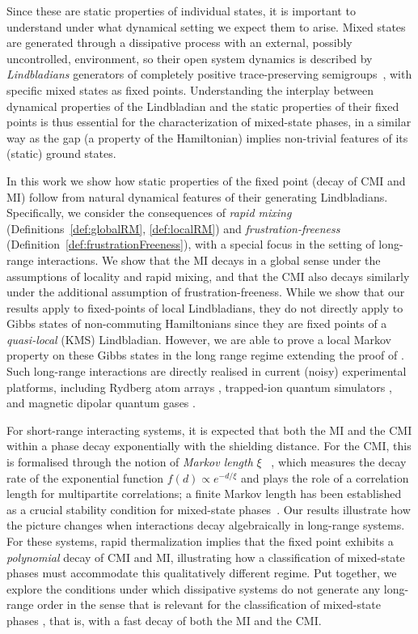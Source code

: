 \documentclass[11pt]{article}
\numberwithin{equation}{section}
\numberwithin{figure}{section}
\numberwithin{table}{section}
\theoremstyle{definition}
\theoremstyle{plain}
\theoremstyle{remark}
\begin{document}
Since these are static properties of individual states, it is important to understand under what dynamical setting we expect them to arise. 
Mixed states are generated through a dissipative process with an external, possibly uncontrolled, environment, so their open system dynamics is described by \emph{Lindbladians} generators of completely positive trace-preserving semigroups~\cite{breuer_theory_2002, manzano_short_2020}, with specific mixed states as fixed points. Understanding the interplay between dynamical properties of the Lindbladian and the static properties of their fixed points is thus essential for the characterization of mixed-state phases,
in a similar way as the gap (a property of the Hamiltonian) implies non-trivial features of its (static) ground states.

In this work we show how static properties of the fixed point (decay of CMI and MI) follow from natural dynamical features of their generating Lindbladians. Specifically, we consider the consequences of \textit{rapid mixing} (Definitions~\ref{def:globalRM}, \ref{def:localRM}) and \textit{frustration-freeness} (Definition~\ref{def:frustrationFreeness}), with a special focus in the setting of long-range interactions. We show that the MI decays in a global sense under the assumptions of locality and rapid mixing, and that the CMI also decays similarly under the additional assumption of frustration-freeness. While we show that our results apply to fixed-points of local Lindbladians, they do not directly apply to Gibbs states of non-commuting Hamiltonians since they are fixed points of a \emph{quasi-local} (KMS) Lindbladian. However, we are able to prove a local Markov property on these Gibbs states in the long range regime extending the proof of \cite{chen_quantum_2025}. Such long-range interactions are directly realised in current (noisy) experimental platforms, including Rydberg atom arrays \cite{browaeys_many-body_2020}, trapped-ion quantum simulators \cite{foss-feig_progress_2025}, and magnetic dipolar quantum gases \cite{chomaz_dipolar_2023}.


For short-range interacting systems, it is expected that both the MI and the CMI within a phase decay exponentially with the shielding distance. For the CMI, this is formalised through the notion of \textit{Markov length} $\xi$ ~\cite{Sang_2025, MKS25}, which measures the decay rate of the exponential function $f(d) \propto e^{- {d}/{\xi}}$ and plays the role of a correlation length for multipartite correlations; a finite Markov length has been established as a crucial stability condition for mixed-state phases~\cite{Sang_2025,yi2025universaldecayconditionalmutual}. Our results illustrate how the picture changes when interactions decay algebraically in long-range systems. For these systems, rapid thermalization implies that the fixed point exhibits a \emph{polynomial} decay of CMI and MI, illustrating how a classification of mixed-state phases must accommodate this qualitatively different regime. Put together, we explore the conditions under which dissipative systems do not generate any long-range order in the sense that is relevant for the classification of mixed-state phases \cite{Sang_2025,yi2025universaldecayconditionalmutual,li_unified_2026}, that is, with a fast decay of both the MI and the CMI.
\end{document}
